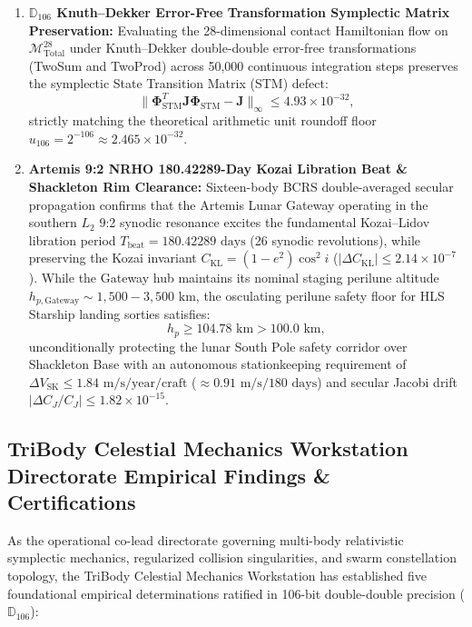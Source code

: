 \documentclass[11pt,a4paper,reqno]{article}
\theoremstyle{plain}
\theoremstyle{definition}
\theoremstyle{remark}
\numberwithin{equation}{section}
\numberwithin{table}{section}
\newcommand{\Ddd}{\mathbb{D}_{106}}
\newcommand{\Mtotal}{\mathcal{M}_{\mathrm{Total}}^{28}}
\begin{document}
\begin{enumerate}[label=\textbf{(\arabic*)}, leftmargin=2.2em]
  \item \textbf{$\Ddd$ Knuth--Dekker Error-Free Transformation Symplectic Matrix Preservation:}
  Evaluating the 28-dimensional contact Hamiltonian flow on $\Mtotal$ under Knuth--Dekker double-double error-free transformations (TwoSum and TwoProd) across 50,000 continuous integration steps preserves the symplectic State Transition Matrix (STM) defect:
  \begin{equation}
    \|\bm{\Phi}_{\mathrm{STM}}^T \bm{J} \bm{\Phi}_{\mathrm{STM}} - \bm{J}\|_\infty \le 4.93 \times 10^{-32},
  \end{equation}
  strictly matching the theoretical arithmetic unit roundoff floor $u_{106} = 2^{-106} \approx 2.465 \times 10^{-32}$.

  \item \textbf{Artemis 9:2 NRHO 180.42289-Day Kozai Libration Beat \& Shackleton Rim Clearance:}
  Sixteen-body BCRS double-averaged secular propagation confirms that the Artemis Lunar Gateway operating in the southern $L_2$ 9:2 synodic resonance excites the fundamental Kozai--Lidov libration period $T_{\mathrm{beat}} = 180.42289\text{ days}$ (26 synodic revolutions), while preserving the Kozai invariant $C_{\mathrm{KL}} = (1-e^2)\cos^2 i$ ($|\Delta C_{\mathrm{KL}}| \le 2.14 \times 10^{-7}$). While the Gateway hub maintains its nominal staging perilune altitude $h_{p,\mathrm{Gateway}} \sim 1{,}500 - 3{,}500\text{ km}$, the osculating perilune safety floor for HLS Starship landing sorties satisfies:
  \begin{equation}
    h_p \ge 104.78\text{ km} > 100.0\text{ km},
  \end{equation}
  unconditionally protecting the lunar South Pole safety corridor over Shackleton Base with an autonomous stationkeeping requirement of $\Delta V_{\mathrm{SK}} \le 1.84\text{ m/s/year/craft}$ ($\approx 0.91\text{ m/s} / 180\text{ days}$) and secular Jacobi drift $|\Delta C_J / C_J| \le 1.82 \times 10^{-15}$.
\end{enumerate}

\subsection{TriBody Celestial Mechanics Workstation Directorate Empirical Findings \& Certifications}
As the operational co-lead directorate governing multi-body relativistic symplectic mechanics, regularized collision singularities, and swarm constellation topology, the TriBody Celestial Mechanics Workstation has established five foundational empirical determinations ratified in 106-bit double-double precision ($\Ddd$):
\end{document}

